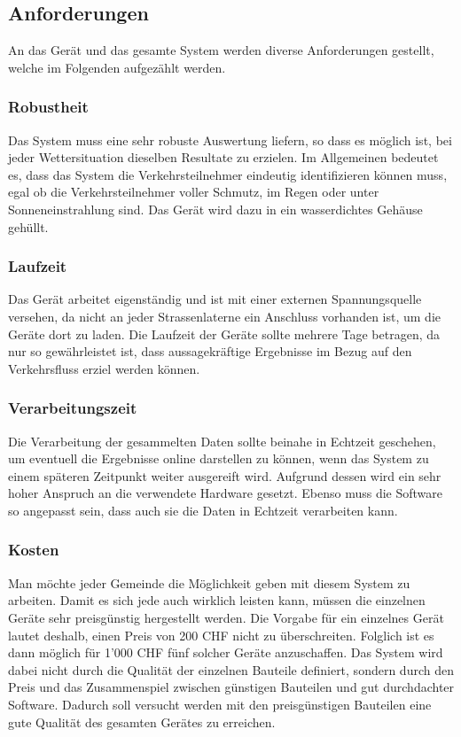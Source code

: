 \subsection{Anforderungen}
An das Gerät und das gesamte System werden diverse Anforderungen gestellt, welche im Folgenden aufgezählt werden.

\subsubsection{Robustheit}
Das System muss eine sehr robuste Auswertung liefern, so dass es möglich ist, bei jeder Wettersituation dieselben Resultate zu erzielen. Im Allgemeinen bedeutet es, dass das System die Verkehrsteilnehmer eindeutig identifizieren können muss, egal ob die Verkehrsteilnehmer voller Schmutz, im Regen oder unter Sonneneinstrahlung sind. Das Gerät wird dazu in ein wasserdichtes Gehäuse gehüllt. 

\subsubsection{Laufzeit}
Das Gerät arbeitet eigenständig und ist mit einer externen Spannungsquelle versehen, da nicht an jeder Strassenlaterne ein Anschluss vorhanden ist, um die Geräte dort zu laden. Die Laufzeit der Geräte sollte mehrere Tage betragen, da nur so gewährleistet ist, dass aussagekräftige Ergebnisse im Bezug auf den Verkehrsfluss erziel werden können.  

\subsubsection{Verarbeitungszeit}
Die Verarbeitung der gesammelten Daten sollte beinahe in Echtzeit geschehen, um eventuell die Ergebnisse online darstellen zu können, wenn das System zu einem späteren Zeitpunkt weiter ausgereift wird. Aufgrund dessen wird ein sehr hoher Anspruch an die verwendete Hardware gesetzt. Ebenso muss die Software so angepasst sein, dass auch sie die Daten in Echtzeit verarbeiten kann.

\subsubsection{Kosten}
Man möchte jeder Gemeinde die Möglichkeit geben mit diesem System zu arbeiten. Damit es sich jede auch wirklich leisten kann, müssen die einzelnen Geräte sehr preisgünstig hergestellt werden. Die Vorgabe für ein einzelnes Gerät lautet deshalb, einen Preis von 200 CHF nicht zu überschreiten. Folglich ist es dann möglich für 1'000 CHF fünf solcher Geräte anzuschaffen. Das System wird dabei nicht durch die Qualität der einzelnen Bauteile definiert, sondern durch den Preis und das Zusammenspiel zwischen günstigen Bauteilen und gut durchdachter Software. Dadurch soll versucht werden mit den preisgünstigen Bauteilen eine gute Qualität des gesamten Gerätes zu erreichen.